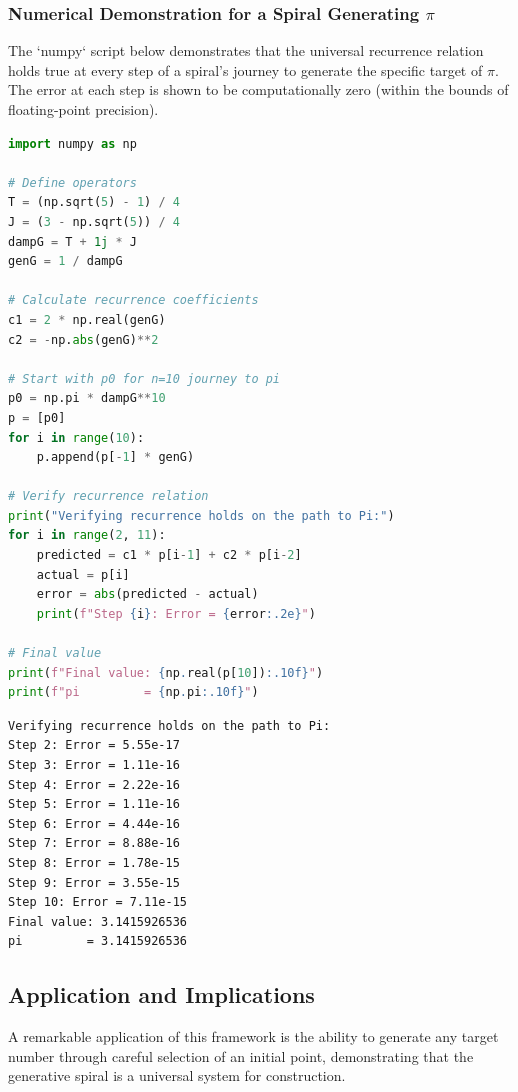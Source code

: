 \subsubsection{Numerical Demonstration for a Spiral Generating \texorpdfstring{$\pi$}{π}}
The `numpy` script below demonstrates that the universal recurrence relation holds true at every step of a spiral's journey to generate the specific target of $\pi$. The error at each step is shown to be computationally zero (within the bounds of floating-point precision).

\begin{lstlisting}[language=Python, caption={Numerical verification of the recurrence relation for a spiral generating pi.}, label={lst:pi_recurrence_verify}]
import numpy as np

# Define operators
T = (np.sqrt(5) - 1) / 4
J = (3 - np.sqrt(5)) / 4
dampG = T + 1j * J
genG = 1 / dampG

# Calculate recurrence coefficients
c1 = 2 * np.real(genG)
c2 = -np.abs(genG)**2

# Start with p0 for n=10 journey to pi
p0 = np.pi * dampG**10
p = [p0]
for i in range(10):
    p.append(p[-1] * genG)

# Verify recurrence relation
print("Verifying recurrence holds on the path to Pi:")
for i in range(2, 11):
    predicted = c1 * p[i-1] + c2 * p[i-2]
    actual = p[i]
    error = abs(predicted - actual)
    print(f"Step {i}: Error = {error:.2e}")

# Final value
print(f"Final value: {np.real(p[10]):.10f}")
print(f"pi         = {np.pi:.10f}")
\end{lstlisting}

\begin{verbatim}
Verifying recurrence holds on the path to Pi:
Step 2: Error = 5.55e-17
Step 3: Error = 1.11e-16
Step 4: Error = 2.22e-16
Step 5: Error = 1.11e-16
Step 6: Error = 4.44e-16
Step 7: Error = 8.88e-16
Step 8: Error = 1.78e-15
Step 9: Error = 3.55e-15
Step 10: Error = 7.11e-15
Final value: 3.1415926536
pi         = 3.1415926536
\end{verbatim}

\subsection{Application and Implications}
A remarkable application of this framework is the ability to generate any target number through careful selection of an initial point, demonstrating that the generative spiral is a universal system for construction.

